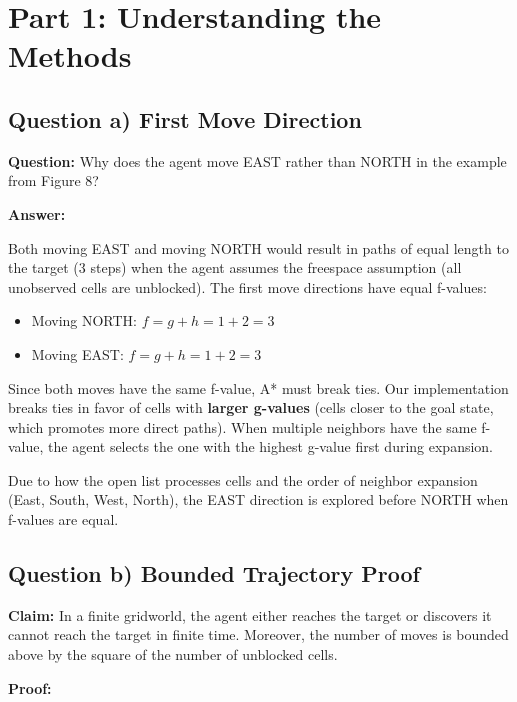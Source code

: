 \documentclass[12pt]{article}
\begin{document}
\section{Part 1: Understanding the Methods}

\subsection{Question a) First Move Direction}

\textbf{Question:} Why does the agent move EAST rather than NORTH in the example from Figure 8?

\textbf{Answer:}

Both moving EAST and moving NORTH would result in paths of equal length to the target (3 steps) 
when the agent assumes the freespace assumption (all unobserved cells are unblocked). The first 
move directions have equal f-values:
\begin{itemize}
    \item Moving NORTH: $f = g + h = 1 + 2 = 3$
    \item Moving EAST: $f = g + h = 1 + 2 = 3$
\end{itemize}

Since both moves have the same f-value, A* must break ties. Our implementation breaks ties in 
favor of cells with \textbf{larger g-values} (cells closer to the goal state, which promotes 
more direct paths). When multiple neighbors have the same f-value, the agent selects the one 
with the highest g-value first during expansion.

Due to how the open list processes cells and the order of neighbor expansion (East, South, West, North), 
the EAST direction is explored before NORTH when f-values are equal.

\subsection{Question b) Bounded Trajectory Proof}

\textbf{Claim:} In a finite gridworld, the agent either reaches the target or discovers it cannot 
reach the target in finite time. Moreover, the number of moves is bounded above by the square of 
the number of unblocked cells.

\textbf{Proof:}
\end{document}
